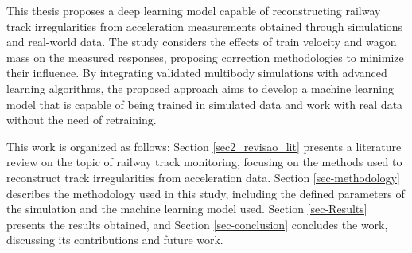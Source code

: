 This thesis proposes a deep learning model capable of reconstructing railway track irregularities from acceleration measurements obtained through simulations and real-world data. The study considers the effects of train velocity and wagon mass on the measured responses, proposing correction methodologies to minimize their influence. By integrating validated multibody simulations with advanced learning algorithms, the proposed approach aims to develop a machine learning model that is capable of being trained in simulated data and work with real data without the need of retraining. 

This work is organized as follows: Section \ref{sec2_revisao_lit} presents a literature review on the topic of railway track monitoring, focusing on the methods used to reconstruct track irregularities from acceleration data. Section \ref{sec-methodology} describes the methodology used in this study, including the defined parameters of the simulation and the machine learning model used. Section \ref{sec-Results} presents the results obtained, and Section \ref{sec-conclusion} concludes the work, discussing its contributions and future work.
